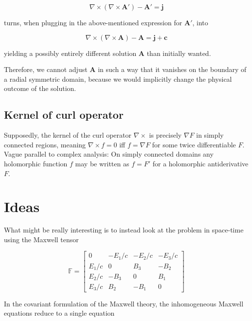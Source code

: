 \documentclass[11pt, a4paper]{article}
\begin{document}
\begin{equation}
    \nabla \times (\nabla \times \mathbf{A}') - \mathbf{A}' = \mathbf{j}
\end{equation}

turns, when plugging in the above-mentioned expression for $\mathbf{A}'$, into 

\begin{equation}
    \nabla \times (\nabla \times \mathbf{A}) - \mathbf{A} = \mathbf{j} + \mathbf{c}
\end{equation}

yielding a possibly entirely different solution $\mathbf{A}$ than initially wanted.

Therefore, we cannot adjust $\mathbf{A}$ in such a way that it vanishes on the
boundary of a radial symmetric domain, because we would implicitly change the 
physical outcome of the solution.

\subsection{Kernel of curl operator}
\label{subsec:curl}

Supposedly, the kernel of the curl operator $\nabla \times$ is precisely
$\nabla F$ in simply connected regions, meaning $\nabla \times f = 0$ iff 
$f = \nabla F$ for some twice differentiable $F$. Vague parallel to complex 
analysis:  On simply connected domains any holomorphic function $f$ may be written
as $f = F'$ for a holomorphic antiderivative $F$.

\section{Ideas}
\label{sec:ideas}

What might be really interesting is to instead look at the problem in space-time 
using the Maxwell tensor

\begin{equation}
    \mathbb{F} = \begin{bmatrix}
        0 & -E_1/c & -E_2/c & -E_3/c \\
        E_1/c & 0 & B_3 & -B_2 \\ 
        E_2/c & -B_3 & 0 & B_1 \\ 
        E_3/c & B_2 & -B_1 & 0
    \end{bmatrix}
\end{equation}

In the covariant formulation of the Maxwell theory, the inhomogeneous Maxwell
equations reduce to a single equation
\end{document}
